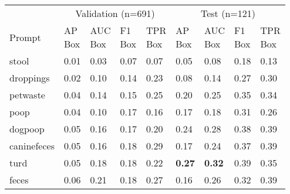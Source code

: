 \begin{table*}[t]
\ifwacv \else \CaptionPrompt \fi
\centering
\begin{tabular}{lllllllll}
\toprule
\multicolumn{1}{l}{} & \multicolumn{4}{c}{Validation (n=691)} & \multicolumn{4}{c}{Test (n=121)} \\
 Prompt      & \makecell{AP\\Box}   & \makecell{AUC\\Box}   & \makecell{F1\\Box}   & \makecell{TPR\\Box}   & \makecell{AP\\Box}   & \makecell{AUC\\Box}   & \makecell{F1\\Box}   & \makecell{TPR\\Box}   \\
\midrule
 stool       & 0.01                 & 0.03                  & 0.07                 & 0.07                  & 0.05                 & 0.08                  & 0.18                 & 0.13                  \\
 droppings   & 0.02                 & 0.10                  & 0.14                 & 0.23                  & 0.08                 & 0.14                  & 0.27                 & 0.30                  \\
 petwaste    & 0.04                 & 0.14                  & 0.15                 & 0.25                  & 0.20                 & 0.25                  & 0.35                 & 0.34                  \\
 poop        & 0.04                 & 0.10                  & 0.17                 & 0.16                  & 0.17                 & 0.18                  & 0.31                 & 0.26                  \\
 dogpoop     & 0.05                 & 0.16                  & 0.17                 & 0.20                  & 0.24                 & 0.28                  & 0.38                 & 0.39                  \\
 caninefeces & 0.05                 & 0.16                  & 0.18                 & 0.29                  & 0.17                 & 0.24                  & 0.37                 & 0.39                  \\
 turd        & 0.05                 & 0.18                  & 0.18                 & 0.22                  & \textbf{0.27}        & \textbf{0.32}         & 0.39                 & 0.35                  \\
 feces       & 0.06                 & 0.21                  & 0.18                 & 0.27                  & 0.16                 & 0.26                  & 0.32                 & 0.39                  \\

\end{tabular}
\end{table*}
